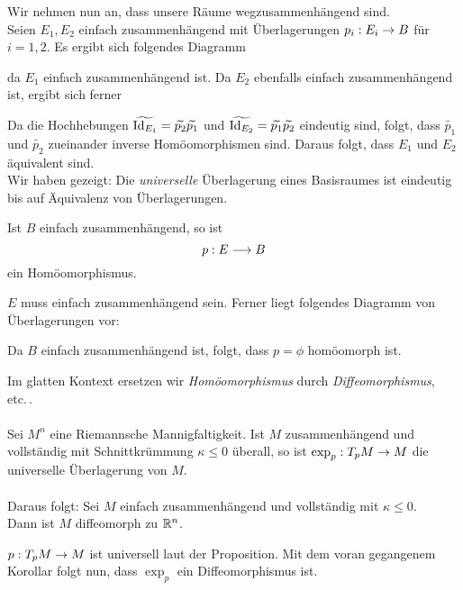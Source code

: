 Wir nehmen nun an, dass unsere Räume wegzusammenhängend sind.\\
Seien $E_1, E_2$ einfach zusammenhängend mit Überlagerungen $p_i : E_i \overset{}{\rightarrow} B$ für $i = 1,2$.
Es ergibt sich folgendes Diagramm
\begin{center}
\end{center}
da $E_1$ einfach zusammenhängend ist. Da $E_2$ ebenfalls einfach zusammenhängend ist, ergibt sich ferner
\begin{center}
\end{center}
Da die Hochhebungen $\widetilde{\text{Id}_{E_1}} = \widetilde{p_2} \widetilde{p_1}$ und $\widetilde{\text{Id}_{E_2}}= \widetilde{p_1} \widetilde{p_2}$ eindeutig sind, folgt, dass $\widetilde{p_1}$ und $\widetilde{p_2}$ zueinander inverse Homöomorphismen sind. Daraus folgt, dass $E_1$ und $E_2$ äquivalent sind.\\
Wir haben gezeigt: Die \emph{universelle} Überlagerung eines Basisraumes ist eindeutig bis auf Äquivalenz von Überlagerungen.

\Kor{}
Ist $B$ einfach zusammenhängend, so ist
\[ p : E \overset{}{\longrightarrow} B \]
ein Homöomorphismus.
\begin{Beweis}{}
$E$ muss einfach zusammenhängend sein.
Ferner liegt folgendes Diagramm von Überlagerungen vor:
\begin{center}
\end{center}
Da $B$ einfach zusammenhängend ist, folgt, dass $p = \phi$ homöomorph ist.
\end{Beweis}

\Bem{}
Im glatten Kontext ersetzen wir \emph{Homöomorphismus} durch \emph{Diffeomorphismus}, etc.\,.\\\\

Sei $M^n$ eine Riemannsche Mannigfaltigkeit.
\Prop{}
\label{PropHadamard}
Ist $M$ zusammenhängend und vollständig mit Schnittkrümmung $\kappa \leq 0$ überall, so ist $\exp_{p} : T_pM \overset{}{\rightarrow} M$ die universelle Überlagerung von $M$.\\\\
Daraus folgt:
Sei $M$ einfach zusammenhängend und vollständig mit $\kappa \leq 0$.\\
Dann ist $M$ diffeomorph zu $\mathbb{R}^n$.
\begin{Beweis}{}
$p : T_pM \overset{}{\rightarrow} M$ ist universell laut der Proposition. Mit dem voran gegangenem Korollar folgt nun, dass $\exp_{p}$ ein Diffeomorphismus ist.
\end{Beweis}\\

